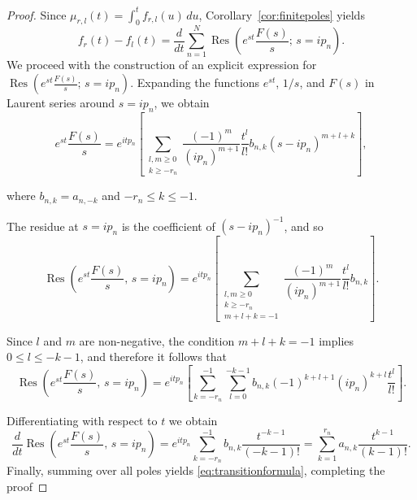\documentclass[12pt]{article}
\theoremstyle{definition}
\DeclareMathOperator*{\Res}{Res}
\begin{document}
\begin{proof}
Since $\mu_{r,l}(t)= \int_{0}^{t} f_{r,l}(u)\,du$, Corollary~\ref{cor:finitepoles} yields
\[
f_r(t)-f_l(t)
=
\frac{d}{dt}
\sum_{n=1}^{N}
\Res\!\left(e^{st}\frac{F(s)}{s};\, s=ip_n\right).
\] We proceed with the construction of an explicit expression for 
$\displaystyle{
\Res\!\left(e^{st}\frac{F(s)}{s};\, s=ip_n\right).}$ Expanding the functions $e^{st}$, $1/s$, and $F(s)$ in Laurent series around $s=ip_n$, we obtain
\begin{equation*}
    \label{eq_finite_transition}
e^{st}\frac{F(s)}{s}
=
e^{itp_n}
\left[
\sum_{\substack{l,m\ge 0 \\ k\ge -r_n}}
\frac{(-1)^m}{(ip_n)^{m+1}}
\frac{t^l}{l!}
b_{n,k}
(s-ip_n)^{m+l+k}
\right],
\end{equation*}


\noindent where $b_{n,k}=a_{n,-k}$ and $-r_n\le k\le -1.$ 

The residue at $s=ip_n$ is the coefficient of $(s-ip_n)^{-1}$, and so
\[
\Res\!\left(e^{st}\frac{F(s)}{s},\, s=ip_n\right)
=
e^{itp_n}
\left[
\sum_{\substack{l,m\ge 0 \\ k\ge -r_n \\ m+l+k=-1}}
\frac{(-1)^m}{(ip_n)^{m+1}}
\frac{t^l}{l!}
b_{n,k}
\right].
\]

\noindent Since $l$ and $m$ are non-negative, the condition $m+l+k=-1$ implies
$0\le l\le -k-1$, and therefore it follows that
\begin{equation}\label{eq:residuecomputation}
\Res\!\left(e^{st}\frac{F(s)}{s},\, s=ip_n\right)
=
e^{itp_n}
\left[
\sum_{k=-r_n}^{-1}
\sum_{l=0}^{-k-1}
b_{n,k}
(-1)^{k+l+1}
(ip_n)^{k+l}
\frac{t^l}{l!}
\right].
\end{equation}

\noindent Differentiating with respect to $t$ we obtain
\begin{equation}\label{eq:differentiationofresidues}
\frac{d}{dt}\Res\!\left(e^{st}\frac{F(s)}{s},\, s=ip_n\right)= e^{itp_n}\sum_{k=-r_n}^{-1}
b_{n,k}
\frac{t^{-k-1}}{(-k-1)!}
=
\sum_{k=1}^{r_n}
a_{n,k}
\frac{t^{k-1}}{(k-1)!}.
\end{equation}
Finally, summing over all poles yields \eqref{eq:transitionformula}, completing the proof
\end{proof}
\end{document}
